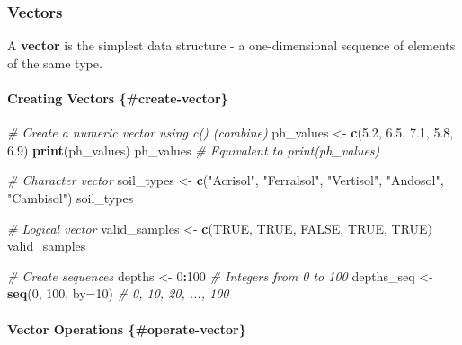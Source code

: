 \documentclass[
  10pt,
  b5paper,
  oneside]{book}
\newenvironment{Shaded}{\begin{snugshade}}{\end{snugshade}}
\newcommand{\AttributeTok}[1]{\textcolor[rgb]{0.13,0.29,0.53}{#1}}
\newcommand{\CommentTok}[1]{\textcolor[rgb]{0.56,0.35,0.01}{\textit{#1}}}
\newcommand{\ConstantTok}[1]{\textcolor[rgb]{0.56,0.35,0.01}{#1}}
\newcommand{\DecValTok}[1]{\textcolor[rgb]{0.00,0.00,0.81}{#1}}
\newcommand{\FloatTok}[1]{\textcolor[rgb]{0.00,0.00,0.81}{#1}}
\newcommand{\FunctionTok}[1]{\textcolor[rgb]{0.13,0.29,0.53}{\textbf{#1}}}
\newcommand{\NormalTok}[1]{#1}
\newcommand{\OtherTok}[1]{\textcolor[rgb]{0.56,0.35,0.01}{#1}}
\newcommand{\SpecialCharTok}[1]{\textcolor[rgb]{0.81,0.36,0.00}{\textbf{#1}}}
\newcommand{\StringTok}[1]{\textcolor[rgb]{0.31,0.60,0.02}{#1}}
\begin{document}
\subsubsection{Vectors}\label{vector-data}

A \textbf{vector} is the simplest data structure - a one-dimensional sequence of elements of the same type.

\paragraph*{Creating Vectors \{\#create-vector\}}\label{creating-vectors-create-vector}

\begin{Shaded}
\begin{Highlighting}[]
\CommentTok{\# Create a numeric vector using c() (combine)}
\NormalTok{ph\_values }\OtherTok{\textless{}{-}} \FunctionTok{c}\NormalTok{(}\FloatTok{5.2}\NormalTok{, }\FloatTok{6.5}\NormalTok{, }\FloatTok{7.1}\NormalTok{, }\FloatTok{5.8}\NormalTok{, }\FloatTok{6.9}\NormalTok{)}
\FunctionTok{print}\NormalTok{(ph\_values)}
\NormalTok{ph\_values }\CommentTok{\# Equivalent to print(ph\_values)}

\CommentTok{\# Character vector}
\NormalTok{soil\_types }\OtherTok{\textless{}{-}} \FunctionTok{c}\NormalTok{(}\StringTok{"Acrisol"}\NormalTok{, }\StringTok{"Ferralsol"}\NormalTok{, }\StringTok{"Vertisol"}\NormalTok{, }\StringTok{"Andosol"}\NormalTok{, }\StringTok{"Cambisol"}\NormalTok{)}
\NormalTok{soil\_types}

\CommentTok{\# Logical vector}
\NormalTok{valid\_samples }\OtherTok{\textless{}{-}} \FunctionTok{c}\NormalTok{(}\ConstantTok{TRUE}\NormalTok{, }\ConstantTok{TRUE}\NormalTok{, }\ConstantTok{FALSE}\NormalTok{, }\ConstantTok{TRUE}\NormalTok{, }\ConstantTok{TRUE}\NormalTok{)}
\NormalTok{valid\_samples}

\CommentTok{\# Create sequences}
\NormalTok{depths }\OtherTok{\textless{}{-}} \DecValTok{0}\SpecialCharTok{:}\DecValTok{100}                    \CommentTok{\# Integers from 0 to 100}
\NormalTok{depths\_seq }\OtherTok{\textless{}{-}} \FunctionTok{seq}\NormalTok{(}\DecValTok{0}\NormalTok{, }\DecValTok{100}\NormalTok{, }\AttributeTok{by=}\DecValTok{10}\NormalTok{)   }\CommentTok{\# 0, 10, 20, ..., 100}
\end{Highlighting}
\end{Shaded}

\paragraph*{Vector Operations \{\#operate-vector\}}\label{vector-operations-operate-vector}
\end{document}
